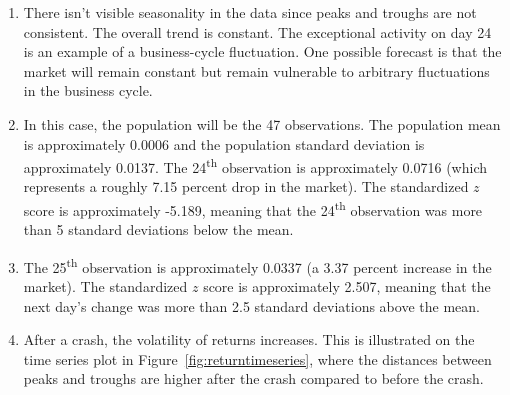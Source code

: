 \documentclass[12pt]{article}
\begin{document}
\begin{enumerate}
    \item There isn't visible seasonality in the data since peaks and troughs are not consistent. The overall trend is constant. The exceptional activity on day 24 is an example of a business-cycle fluctuation. One possible forecast is that the market will remain constant but remain vulnerable to arbitrary fluctuations in the business cycle.
    \item In this case, the population will be the 47 observations. The population mean is approximately 0.0006 and the population standard deviation is approximately 0.0137. The 24\textsuperscript{th} observation is approximately 0.0716 (which represents a roughly 7.15 percent drop in the market). The standardized $z$ score is approximately -5.189, meaning that the 24\textsuperscript{th} observation was more than 5 standard deviations below the mean.
    \item The 25\textsuperscript{th} observation is approximately 0.0337 (a 3.37 percent increase in the market). The standardized $z$ score is approximately 2.507, meaning that the next day's change was more than 2.5 standard deviations above the mean.
    \item After a crash, the volatility of returns increases. This is illustrated on the time series plot in Figure~\ref{fig:returntimeseries}, where the distances between peaks and troughs are higher after the crash compared to before the crash.
\end{enumerate}
\end{document}
